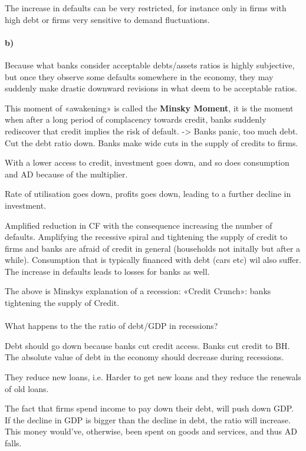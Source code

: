 \documentclass{report}
\begin{document}
The increase in defaults can be very restricted, for instance only in firms with high debt or firms very sensitive to demand fluctuations. 

\paragraph{b)}

Because what banks consider acceptable debts/assets ratios is highly subjective, but once they observe some defaults somewhere in the economy, they may suddenly make drastic downward revisions in what deem to be acceptable ratios. 

This moment of «awakening» is called the \textbf{Minsky Moment}, it is the moment when after a long period of complacency towards credit, banks suddenly rediscover that credit implies the risk of default. -> Banks panic, too much debt. Cut the debt ratio down. Banks make wide cuts in the supply of credits to firms. 

With a lower access to credit, investment goes down, and so does consumption and AD because of the multiplier.

Rate of utilisation goes down, profits goes down, leading to a further decline in investment. 

Amplified reduction in CF with the consequence increasing the number of defaults. Amplifying the recessive spiral and tightening the supply of credit to firms and banks are afraid of credit in general (households not initally but after a while). Consumption that is typically financed with debt (cars etc) wil also suffer. The increase in defaults leads to losses for banks as well. 

The above is Minskys explanation of a recession: «Credit Crunch»: banks tightening the supply of Credit.

\paragraph{} What happens to the the ratio of debt/GDP in recessions?

Debt should go down because banks cut credit access. Banks cut credit to BH. The absolute value of debt in the economy should decrease during recessions. 

They reduce new loans, i.e. Harder to get new loans and they reduce the renewals of old loans. 

The fact that firms spend income to pay down their debt, will push down GDP. If the decline in GDP is bigger than the decline in debt, the ratio will increase. This money would've, otherwise, been spent on goods and services, and thus AD falls. 
\end{document}
